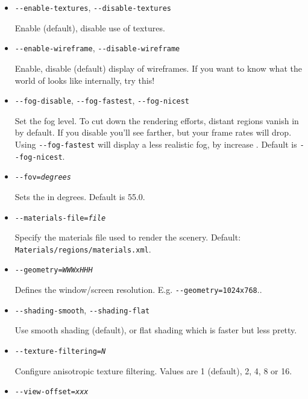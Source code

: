 \begin{itemize}
{\begin{itemize}
  Enable or disable (default) the rotating 3DFX logo when the accelerator board gets initialized (3DFX only).

  \item{\texttt{-$ $-enable-textures}, \texttt{-$ $-disable-textures}}

  Enable (default), disable use of textures.

  \item{\texttt{-$ $-enable-wireframe}, \texttt{-$ $-disable-wireframe}}

  Enable, disable (default) display of wireframes. If you want to know what the world of
  \FlightGear{} looks like internally, try this!

  \item{\texttt{-$ $-fog-disable}, \texttt{-$ $-fog-fastest}, \texttt{-$ $-fog-nicest}}

  Set the fog level. To cut down the rendering efforts, distant regions vanish in  by default.
  If you disable  you'll see farther, but your frame rates will drop. Using \texttt{-$ $-fog-fastest}
  will display a less realistic fog, by increase . Default is \texttt{-$ $-fog-nicest}.

  \item{\texttt{-$ $-fov={\it degrees}}}

  Sets the  in degrees. Default is 55.0.

  \item{\texttt{-$ $-materials-file={\it file}}}

  Specify the materials file used to render the scenery.
  Default: \texttt{Materials/regions/materials.xml}.

  \item{\texttt{-$ $-geometry={\it WWWxHHH}}}

  Defines the window/screen resolution. E.g. \texttt{-$ $-geometry=1024x768}..

  \item{\texttt{-$ $-shading-smooth}, \texttt{-$ $-shading-flat}}

  Use smooth shading (default), or flat shading which is faster but less pretty.

  \item{\texttt{-$ $-texture-filtering={\it N}}}

  Configure anisotropic texture filtering. Values are 1 (default), 2, 4, 8 or 16.

  \item{\texttt{-$ $-view-offset={\it xxx}}}


\end{itemize}}
\end{itemize}
